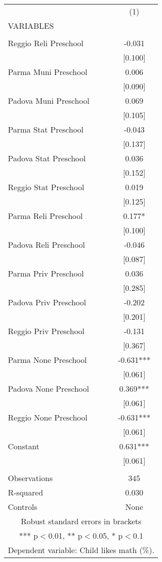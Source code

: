 \begin{tabular}{lc} \hline
 & (1) \\
VARIABLES &  \\ \hline
 &  \\
Reggio Reli Preschool & -0.031 \\
 & [0.100] \\
Parma Muni Preschool & 0.006 \\
 & [0.090] \\
Padova Muni Preschool & 0.069 \\
 & [0.105] \\
Parma Stat Preschool & -0.043 \\
 & [0.137] \\
Padova Stat Preschool & 0.036 \\
 & [0.152] \\
Reggio Stat Preschool & 0.019 \\
 & [0.125] \\
Parma Reli Preschool & 0.177* \\
 & [0.100] \\
Padova Reli Preschool & -0.046 \\
 & [0.087] \\
Parma Priv Preschool & 0.036 \\
 & [0.285] \\
Padova Priv Preschool & -0.202 \\
 & [0.201] \\
Reggio Priv Preschool & -0.131 \\
 & [0.367] \\
Parma None Preschool & -0.631*** \\
 & [0.061] \\
Padova None Preschool & 0.369*** \\
 & [0.061] \\
Reggio None Preschool & -0.631*** \\
 & [0.061] \\
Constant & 0.631*** \\
 & [0.061] \\
 &  \\
Observations & 345 \\
R-squared & 0.030 \\
 Controls & None \\ \hline
\multicolumn{2}{c}{ Robust standard errors in brackets} \\
\multicolumn{2}{c}{ *** p$<$0.01, ** p$<$0.05, * p$<$0.1} \\
\multicolumn{2}{c}{ Dependent variable: Child likes math (\%).} \\
\end{tabular}
